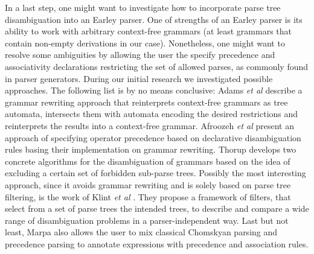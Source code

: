 \begin{isabellebody}
\begin{isamarkuptext}
In a last step, one might want to investigate how to incorporate parse tree disambiguation into an
Earley parser. One of strengths of an Earley parser is its ability to work with arbitrary context-free
grammars (at least grammars that contain non-empty derivations in our case). Nonetheless, one might
want to resolve some ambiguities by allowing the user the specify precedence and associativity declarations
restricting the set of allowed parses, as commonly found in parser generators. During our initial
research we investigated possible approaches. The following list is by no means conclusive:
Adams \textit{et al} \cite{Adams:2017} describe a grammar rewriting approach that reinterprets context-free
grammars as tree automata, intersects them with automata encoding the desired restrictions and reinterprets
the results into a context-free grammar. Afroozeh \textit{et al} \cite{Afroozeh:2013} present an approach
of specifying operator precedence based on declarative disambiguation rules basing their implementation
on grammar rewriting. Thorup \cite{Thorup:1996} develops two concrete algorithms for the disambiguation of
grammars based on the idea of excluding a certain set of forbidden sub-parse trees.
Possibly the most interesting approach, since it avoids grammar rewriting and is solely based on parse
tree filtering, is the work of Klint \textit{et al} \cite{Klint:1997}. They propose a framework of filters, that select from
a set of parse trees the intended trees, to describe and compare a wide range of disambiguation problems
in a parser-independent way. Last but not least, Marpa also allows the user to mix classical Chomskyan
parsing and precedence parsing to annotate expressions with precedence and association rules.%
\end{isamarkuptext}\isamarkuptrue%
%
\isadelimtheory
%
\endisadelimtheory
%
\isatagtheory
%
\endisatagtheory
{\isafoldtheory}%
%
\isadelimtheory
%
\endisadelimtheory
%
\end{isabellebody}%
\endinput
